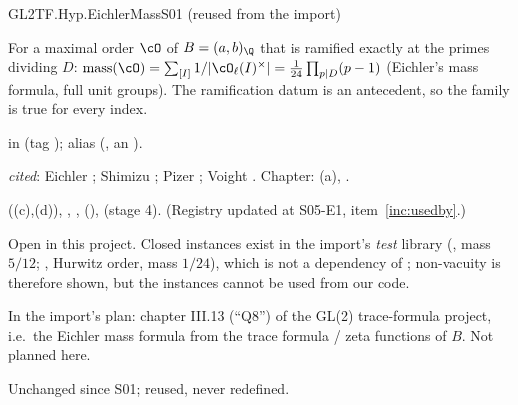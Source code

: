 \begin{hypentry}{GL2TF.Hyp.EichlerMass}{\kindlit}{S01 (reused from the import)}
\item[Statement] For a maximal order $\cO$ of $B=(a,b)_\Q$ that is ramified exactly at the primes dividing $D$:
  $\operatorname{mass}(\cO)=\sum_{[I]} 1/|\cO_\ell(I)^\times| = \frac{1}{24}\prod_{p\mid D}(p-1)$ (Eichler's mass formula,
  full unit groups). The ramification datum is an antecedent, so the family is true for every index.
\item[Lean]  in
   (tag );
  alias  (, an ).
\item[Source] \emph{cited}: Eichler \cite{Eic55}; Shimizu \cite[(20)--(21), p.~180]{Shz65}; Pizer
  \cite[P0.5]{Piz80}; Voight \cite{Vo}. Chapter: (a), .
\item[Used by]  ((c),(d)), ,
  ,  (),
   (stage 4). (Registry updated at S05-E1, item~\ref{inc:usedby}.)
\item[Status] Open in this project. Closed instances exist in the import's \emph{test} library
  (, mass $5/12$; , Hurwitz order, mass $1/24$),
  which is not a dependency of ; non-vacuity is therefore shown, but the instances cannot be
  used from our code.
\item[Discharge] In the import's plan: chapter III.13 (``Q8'') of the GL(2) trace-formula project, i.e.\ the
  Eichler mass formula from the trace formula / zeta functions of $B$. Not planned here.
\item[History] Unchanged since S01; reused, never redefined.
\end{hypentry}

